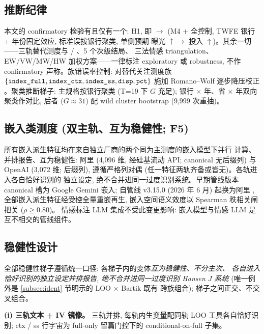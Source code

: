 \subsection{推断纪律}\label{subsec:inference}
本文的 confirmatory 检验有且仅有一个: H1, 即
 $\to$ 
(M4 + 全控制, TWFE 银行 + 年份固定效应, 标准误按银行聚类, 单侧预期
曝光 $\uparrow \to$ 投入 $\uparrow$)。其余一切——三轨替代测度与
 / 、5 个次级结局、
三法情感 triangulation、EW/VW/MW/HW 加权方案——一律标注 exploratory 或
robustness, 不作 confirmatory 声称。族错误率控制: 对替代关注测度族
$\{\texttt{index\_full}, \texttt{index\_ctx}, \texttt{index\_ss}, \texttt{disp},
\texttt{pct}\}$ 施加 Romano--Wolf 逐步降压校正
\parencite{romanowolf2005snooping}。聚类推断梯子: 主规格按银行聚类
(T=19 下 $G$ 充足); 银行 $\times$ 年、省 $\times$ 年双向聚类作对比, 后者
($G \approx 31$) 配 wild cluster bootstrap (9{,}999 次重抽)。

\subsection{嵌入类测度 (双主轨、互为稳健性; F5)}
所有嵌入派生特征均在来自独立厂商的两个同为主测度的嵌入模型下并行
计算、并排报告、互为稳健性: 阿里 
(4{,}096 维, 经硅基流动 API; canonical 无后缀列) 与 OpenAI
 (3{,}072 维;  后缀列),
遵循严格列对偶 (任一特征两轨齐备或皆无)。各轨进入各自恰好识别的
独立设定, 绝不合并进同一过度识别系统。早期管线版本 canonical 槽为
Google Gemini 嵌入; 自管线 v3.15.0 (2026 年 6 月) 起换为阿里
, 全部嵌入派生特征经受控全量重嵌再生,
嵌入空间语义效度以 Spearman 秩相关闸把关 ($\rho \geq 0.80$)。
情感标注 LLM 集成不受此变更影响: 嵌入模型与情感 LLM
是互不相交的管线组件。

\subsection{稳健性设计}\label{subsec:robust}
全部稳健性梯子遵循统一口径: 各梯子内的变体\emph{互为稳健性、不分主次、
各自进入恰好识别的独立设定并排报告, 绝不合并进同一过度识别 Hansen $J$
系统} (唯一例外是 \ref{subsec:ident} 节明示的 LOO $\times$ Bartik 既有
跨族组合); 梯子之间正交、不交叉组合。

\textbf{(i) 三轨文本 + IV 镜像。} 
三轨并排, 每轨内生变量配同轨 LOO 工具各自恰好识别; ctx / ss 行宇宙为
full-only 留篇门控下的 conditional-on-full 子集。

